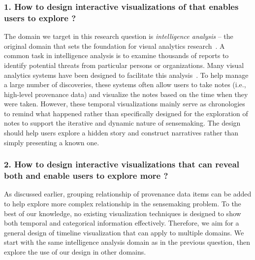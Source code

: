 \subsubsection*{1. How to design interactive visualizations of  that enables users to explore ?}
The domain we target in this research question is \emph{intelligence analysis} -- the original domain that sets the foundation for visual analytics research~\cite{Thomas2005}. A common task in intelligence analysis is to examine thousands of reports to identify potential threats from particular persons or organizations. Many visual analytics systems have been designed to facilitate this analysis~\cite{Wright2006,Stasko2007}. To help manage a large number of discoveries, these systems often allow users to take notes (i.e., high-level provenance data) and visualize the notes based on the time when they were taken. However, these temporal visualizations mainly serve as chronologies to remind what happened rather than specifically designed for the exploration of notes to support the iterative and dynamic nature of sensemaking. The design should help users explore a hidden story and construct narratives rather than simply presenting a known one. 

\subsubsection*{2. How to design interactive visualizations that can reveal both  and enable users to explore more ?}
As discussed earlier, grouping relationship of provenance data items can be added  to help explore more complex relationship in the sensemaking problem. To the best of our knowledge, no existing visualization techniques is designed to show both temporal and categorical information effectively. Therefore, we aim for a general design of timeline visualization that can apply to multiple domains. We start with the same intelligence analysis domain as in the previous question, then explore the use of our design in other domains.

